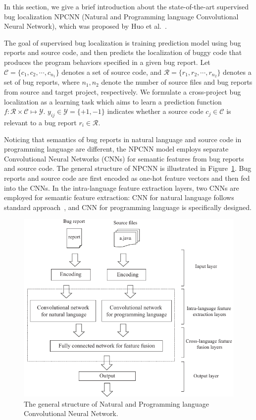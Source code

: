 In this section, we give a brief introduction about the state-of-the-art supervised bug localization NPCNN (Natural and Programming language Convolutional Neural Network), which was proposed by Huo et al.~\cite{huo2016learning}. %

The goal of supervised bug localization is training prediction model using bug reports and source code,  and then predicts the localization of buggy code that produces the program behaviors specified in a given bug report. Let $\mathcal{C} =\{ c_1, c_2, \cdots, c_{n_1} \}$ denotes a set of source code, and $\mathcal{R} =\{ r_1, r_2, \cdots, r_{n_2}\} $ denotes a set of bug reports, where $n_1, n_2$ denote the number of source files and bug reports from source and target project, respectively. We formulate a cross-project bug localization as a learning task which aims to learn a prediction function $f: \mathcal{R} \times \mathcal{C} \mapsto \mathcal{Y}$. $y_{ij} \in \mathcal{Y} = \{+1, -1 \}$ indicates whether a source code $c_j \in \mathcal{C} $ is relevant to a bug report $r_i \in \mathcal{R}$.

Noticing that semantics of bug reports in natural language and source code in programming language are different, the NPCNN model employs separate Convolutional Neural Networks (CNNs) for semantic features from bug reports and source code. The general structure of NPCNN is illustrated in Figure~\ref{fig:npcnn-structure}. Bug reports and source code are first encoded as one-hot feature vectors and then fed into the CNNs. In the intra-language feature extraction layers, two CNNs are employed for semantic feature extraction: CNN for natural language follows standard approach~\cite{kim2014convolutional}, and CNN for programming language is specifically designed. 

\begin{figure}[hbt]
\centering
\includegraphics[width = \columnwidth]{pic/NPCNN-structure.pdf}
\caption{The general structure of Natural and Programming language Convolutional Neural Network.}
\label{fig:npcnn-structure}
\end{figure}

